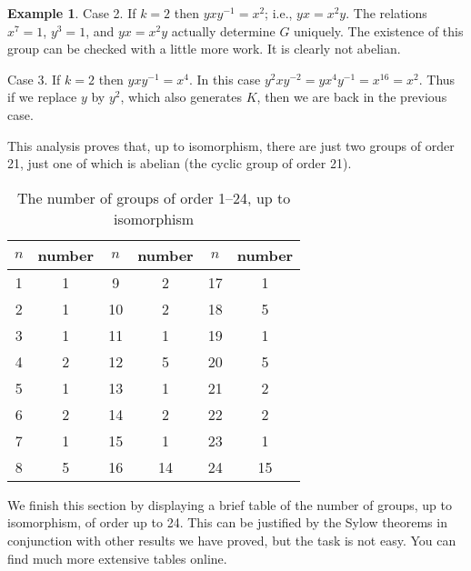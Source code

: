 \documentclass[11pt,oneside]{article}
\theoremstyle{definition}
\newtheorem{example}[thm]{Example}
\begin{document}
\begin{example}
Case 2. If $k=2$ then $yxy^{-1} = x^2$; i.e., $yx = x^2y$. The relations
$x^7 =1$, $y^3 = 1$, and $yx = x^2y$ actually determine $G$
uniquely. The existence of this group can be checked with a little
more work. It is clearly not abelian.

Case 3. If $k=2$ then $yxy^{-1} = x^4$. In this case $y^2 x y^{-2} = y
x^4 y^{-1} = x^{16} = x^2$. Thus if we replace $y$ by $y^{2}$, which
also generates $K$, then we are back in the previous case.

This analysis proves that, up to isomorphism, there are just two
groups of order 21, just one of which is abelian (the cyclic group of
order 21).
\end{example}


\begin{table}[h]
\begin{center}
\begin{tabular}{cc|cc|cc}
  $n$ & number & $n$ & number & $n$ & number\\ \hline
  1 & 1 & 9 & 2 & 17 & 1 \\
  2 & 1 & 10 & 2 & 18 & 5 \\
  3 & 1 & 11 & 1 & 19 & 1\\
  4 & 2 & 12 & 5 & 20 & 5\\
  5 & 1 & 13 & 1 & 21 & 2\\
  6 & 2 & 14 & 2 & 22 & 2\\
  7 & 1 & 15 & 1 & 23 & 1\\
  8 & 5 & 16 & 14 & 24 & 15
\end{tabular}
\end{center}
\caption{The number of groups of order 1--24, up to isomorphism}
\end{table}
We finish this section by displaying a brief table of the number of
groups, up to isomorphism, of order up to 24. This can be justified by
the Sylow theorems in conjunction with other results we have proved,
but the task is not easy.  You can find much more extensive tables
online.
\end{document}
